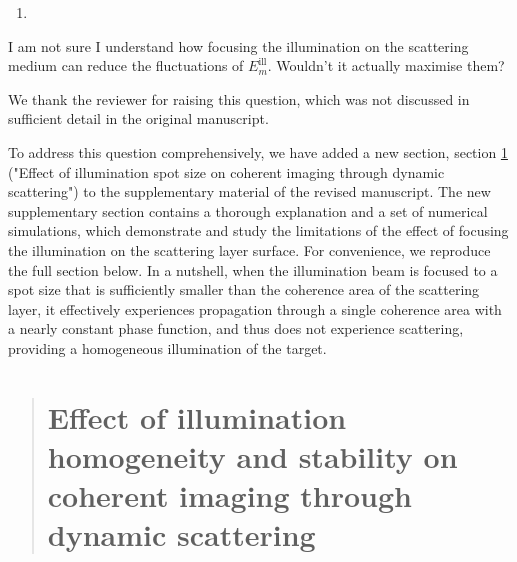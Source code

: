 \documentclass[12pt]{article}
\newenvironment{solved_reviewercomment}
    {\begin{tcolorbox}[width=\linewidth,colback=gray!5,colframe=solved_commentcolor!50,title=Reviewer Comment,left=5pt,right=5pt]}
    {\end{tcolorbox}}
\newenvironment{finished_ourresponse}
    {\begin{tcolorbox}[width=\linewidth,breakable,enhanced,colback=gray!5,colframe=finished_responsecolor!50,title=Response,left=5pt,right=5pt]}
    {\end{tcolorbox}}
\begin{document}
        
\begin{enumerate}[label=\arabic*., resume]
\item \leavevmode
\end{enumerate}
\vspace{-1em}
\begin{solved_reviewercomment}
    I am not sure I understand how focusing the illumination on the scattering medium can reduce the fluctuations of \(E^{\text{ill}}_m\). Wouldn't it actually maximise them?    
\end{solved_reviewercomment}

\begin{finished_ourresponse}
We thank the reviewer for raising this question, which was not discussed in sufficient detail in the original manuscript.

To address this question comprehensively, we have added a new section, section \ref{sec: effect of spot size} ("Effect of illumination spot size on coherent imaging through dynamic scattering") to the supplementary material of the revised manuscript. The new supplementary section contains a thorough explanation and a set of numerical simulations, which demonstrate and study the limitations of the effect of focusing the illumination on the scattering layer surface. For convenience, we reproduce the full section below. In a nutshell, when the illumination beam is focused to a spot size that is sufficiently smaller than the coherence area of the scattering layer, it effectively experiences propagation through a single coherence area with a nearly constant phase function, and thus does not experience scattering, providing a homogeneous illumination of the target.
\begin{quote}
    \setcounter{section}{224}
        \section{Effect of illumination homogeneity and stability on coherent imaging through dynamic scattering}
    \label{sec: effect of spot size}
    


\end{quote}
\end{finished_ourresponse}
\end{document}
